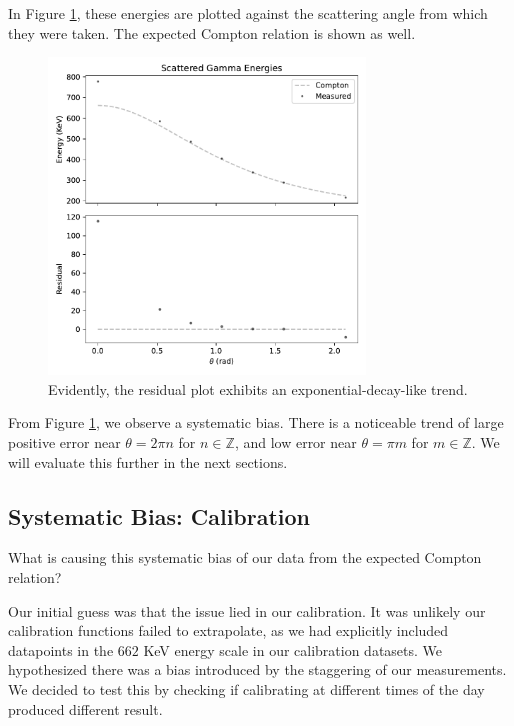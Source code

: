 \documentclass[12pt, letterpaper]{article}
\begin{document}
In Figure \ref{fig:scattering-1}, these energies are plotted against the scattering angle from which they were taken. The expected Compton relation is shown as well. 

\begin{figure}[!h]
    \centering
    \includegraphics[width=0.75\textwidth]{experiment2/figures/scattering1.pdf}
    \caption{Evidently, the residual plot exhibits an exponential-decay-like trend. }
    \label{fig:scattering-1}
\end{figure}

From Figure \ref{fig:scattering-1}, we observe a systematic bias. There is a noticeable trend of large positive error near $\theta = 2 \pi n$ for $n \in \mathbb{Z}$, and low error near $\theta = \pi m$ for $m \in \mathbb{Z}$. We will evaluate this further in the next sections. 

\subsection{Systematic Bias: Calibration}

What is causing this systematic bias of our data from the expected Compton relation?

Our initial guess was that the issue lied in our calibration. It was unlikely our calibration functions failed to extrapolate, as we had explicitly included datapoints in the $662$ KeV energy scale in our calibration datasets. We hypothesized there was a bias introduced by the staggering of our measurements. We decided to test this by checking if calibrating at different times of the day produced different result. 
\end{document}
